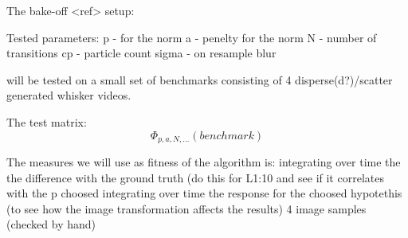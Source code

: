 
The bake-off <ref> setup:

Tested parameters:
    p     - for the norm
    a     - penelty for the norm
    N     - number of transitions
    cp    - particle count
    sigma - on resample blur

will be tested on a small set of benchmarks consisting of 4 disperse(d?)/scatter generated whisker videos.

The test matrix:
\begin{equation}
    \Phi_{p,a,N,...}(benchmark)
\end{equation}

The measures we will use as fitness of the algorithm is:
    integrating over time the the difference with the ground truth (do this for L{1:10} and see if it correlates with the p choosed
    integrating over time the response for the choosed hypotethis (to see how the image transformation affects the results)
    4 image samples (checked by hand)



